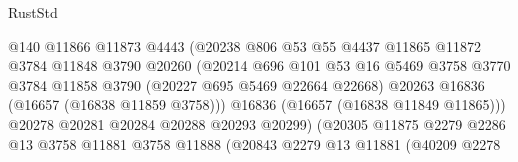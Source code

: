 \begin{lexlean}{RustStd}
\begin{coremodule}
                                        @140
                                        @11866
                                        @11873
                                        @4443
                                        (@20238
                                          @806
                                          @53
                                          @55
                                          @4437
                                          @11865
                                          @11872
                                          @3784
                                          @11848
                                          @3790
                                          @20260
                                          (@20214
                                            @696
                                            @101
                                            @53
                                            @16
                                            @5469
                                            @3758
                                            @3770
                                            @3784
                                            @11858
                                            @3790
                                            (@20227 @695 @5469 @22664 @22668)
                                            @20263
                                            @16836
                                            (@16657 (@16838 @11859 @3758)))
                                          @16836
                                          (@16657 (@16838 @11849 @11865)))
                                        @20278
                                        @20281
                                        @20284
                                        @20288
                                        @20293
                                        @20299)
                                      (@20305
                                        @11875
                                        @2279
                                        @2286
                                        @13
                                        @3758
                                        @11881
                                        @3758
                                        @11888
                                        (@20843
                                          @2279
                                          @13
                                          @11881
                                          (@40209
                                            @2278

\end{coremodule}
\end{lexlean}
